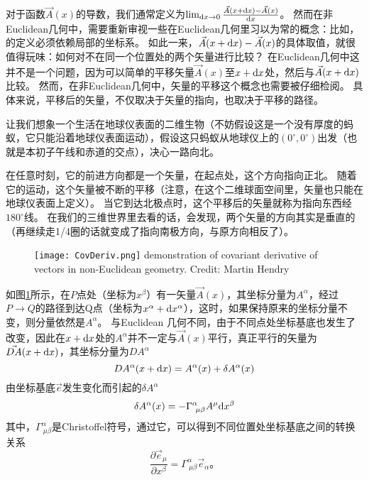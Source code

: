 对于函数$\vec{A}(x)$的导数，我们通常定义为$\lim_{{\rm d}x \to 0}\frac{\vec{A}(x+{\rm d}x)-\vec{A}(x)}{{\rm d}x}$。
然而在非Euclidean几何中，需要重新审视一些在Euclidean几何里习以为常的概念：比如，{}的定义必须依赖局部的坐标系。
如此一来，$\vec{A}(x+{\rm d}x)-\vec{A}(x)$的具体取值，就很值得玩味：如何对不在同一个位置处的两个矢量进行比较？
在Euclidean几何中这并不是一个问题，因为可以简单的平移矢量$\vec{A}(x)$至$x+{\rm d}x$处，然后与$\vec{A}(x+{\rm d}x)$比较。
然而，在非Euclidean几何中，矢量的平移这个概念也需要被仔细检阅。
具体来说，平移后的矢量，不仅取决于矢量的指向，也取决于平移的路径。

\begin{example}

让我们想象一个生活在地球仪表面的二维生物（不妨假设这是一个没有厚度的蚂蚁，它只能沿着地球仪表面运动），假设这只蚂蚁从地球仪上的$(0^\circ,0^\circ)$出发（也就是本初子午线和赤道的交点），决心一路向北。

在任意时刻，它的前进方向都是一个矢量，在起点处，这个方向指向正北。
随着它的运动，这个矢量被不断的平移（注意，在这个二维球面空间里，矢量也只能在地球仪表面上定义）。
当它到达北极点时，这个平移后的矢量就称为指向东西经$180^\circ$线。
在我们的三维世界里去看的话，会发现，两个矢量的方向其实是垂直的（再继续走1/4圈的话就变成了指向南极方向，与原方向相反了）。
\end{example}

\begin{figure}[htp]
\centering
\texttt{[image: CovDeriv.png]}
  {demonstration of covariant derivative of vectors in non-Euclidean geometry. Credit: Martin Hendry}
\label{fig:CovDeriv}
\end{figure}

如图\ref{fig:CovDeriv}所示，在$P$点处（坐标为$x^\beta$）有一矢量$\vec{A}(x)$，其坐标分量为$A^\alpha$，经过$P \to Q$的路径到达Q点（坐标为$x^\alpha+{\rm d}x^\alpha$），这时，如果保持原来的坐标分量不变，则分量依然是$A^\alpha$。
与Euclidean 几何不同，由于不同点处坐标基底也发生了改变，因此在$x+{\rm d}x$处的$A^\alpha$并不一定与$\vec{A}(x)$平行，真正平行的矢量为$\vec{DA}(x+{\rm d}x)$，其坐标分量为$DA^\alpha$
\begin{equation}\label{eq:parallel}
  DA^\alpha(x+{\rm d}x) = A^\alpha(x) + \delta A^\alpha(x)
\end{equation}
由坐标基底$\vec{e}$发生变化而引起的$\delta A^\alpha$
\begin{equation}\label{eq:deltaA}
  \delta A^\alpha(x) = -\Gamma^\alpha_{~\mu\beta} A^\mu {\rm d}x^\beta
\end{equation}
其中，$\Gamma^\alpha_{~\mu\beta}$是Christoffel符号，通过它，可以得到不同位置处坐标基底之间的转换关系
\begin{equation}\label{eq:Christoffel}
\frac{\partial \vec{e}_\mu}{\partial x^\beta} = \Gamma^\alpha_{~\mu\beta} \vec{e}_\alpha。
\end{equation}

